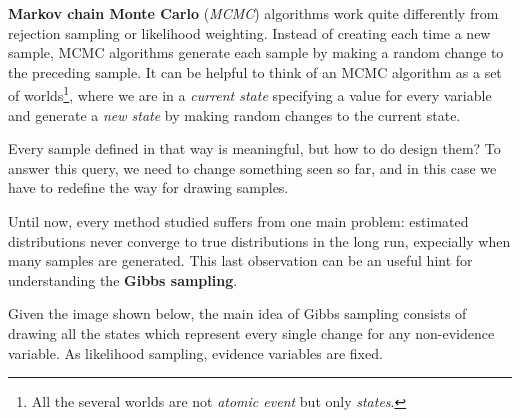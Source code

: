 \textbf{Markov chain Monte Carlo} (\textit{MCMC}) algorithms work quite differently from rejection sampling or likelihood weighting. Instead of creating each time a 
new sample, MCMC algorithms generate each sample by making a random change to the preceding sample. It can be helpful to think of an MCMC algorithm as a set of worlds\footnote{All the several worlds are not \textit{atomic event} but only \textit{states}.},
where we are in a \textit{current state} specifying a value for every variable and generate a \textit{new state} by making random changes to the current state. \vspace{3.5pt}

Every sample defined in that way is meaningful, but how to do design them? To answer this query, we need to change something seen so far, and in this case we have to redefine
the way for drawing samples. \vspace{3.5pt}

Until now, every method studied suffers from one main problem: estimated distributions never converge to true distributions in the long run, expecially when many samples 
are generated. This last observation can be an useful hint for understanding the \textbf{Gibbs sampling}. \vspace{3.5pt}

Given the image shown below, the main idea of Gibbs sampling consists of drawing all the states which represent every single change for any non-evidence variable. As likelihood
sampling, evidence variables are fixed. \vspace{3.5pt}

